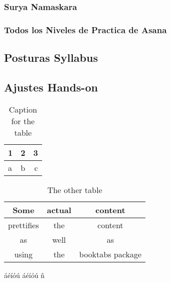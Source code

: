 \documentclass[a4paper]{book}
\begin{document}
\subsubsection{Surya Namaskara}
\subsubsection{Todos los Niveles de Practica de Asana}
\subsection{Posturas Syllabus}
\subsection{Ajustes Hands-on}


\begin{table}[h!]
	\centering
	\begin{tabular}{l|c||r}
		1 & 2 & 3\\
		\hline
		a & b & c\\
	\end{tabular}
	\caption{Caption for the table}
	\label{tab:table}
\end{table}


\begin{table}[h!]
	\centering
	\begin{tabular}{ccc}
		\toprule
		Some & actual & content\\
		\midrule
		prettifies & the & content\\
		as & well & as \\
		using & the & booktabs package\\
		\bottomrule
	\end{tabular}
	\caption{The other table}
	\label{tab:table2}
\end{table}


\newpage
áéíóú
\'a\'e\'i\'o\'u
ñ
\end{document}
